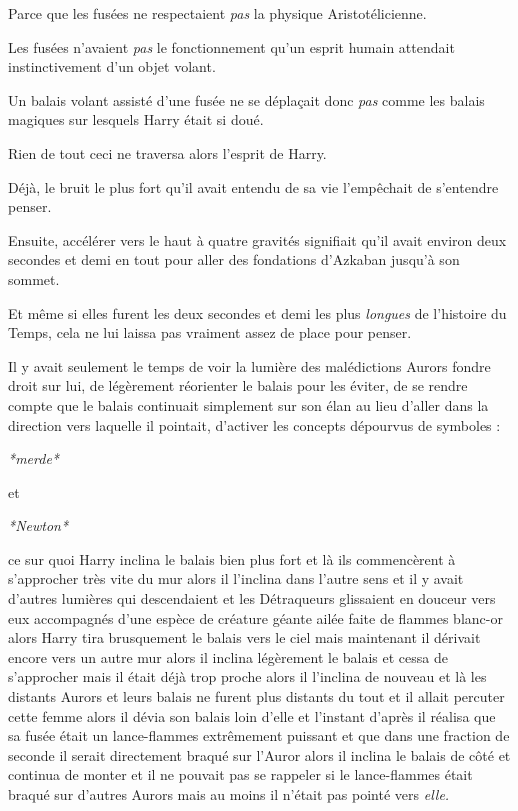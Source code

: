 Parce que les fusées ne respectaient \emph{pas}  la physique Aristotélicienne.

Les fusées n'avaient \emph{pas}  le fonctionnement qu'un esprit humain attendait instinctivement d'un objet volant.

Un balais volant assisté d'une fusée ne se déplaçait donc \emph{pas}  comme les balais magiques sur lesquels Harry était si doué.

Rien de tout ceci ne traversa alors l'esprit de Harry.

Déjà, le bruit le plus fort qu'il avait entendu de sa vie l'empêchait de s'entendre penser.

Ensuite, accélérer vers le haut à quatre gravités signifiait qu'il avait environ deux secondes et demi en tout pour aller des fondations d'Azkaban jusqu'à son sommet.

Et même si elles furent les deux secondes et demi les plus \emph{longues}  de l'histoire du Temps, cela ne lui laissa pas vraiment assez de place pour penser.

Il y avait seulement le temps de voir la lumière des malédictions Aurors fondre droit sur lui, de légèrement réorienter le balais pour les éviter, de se rendre compte que le balais continuait simplement sur son élan au lieu d'aller dans la direction vers laquelle il pointait, d'activer les concepts dépourvus de symboles :

\emph{*merde*} 

et

\emph{*Newton*} 

ce sur quoi Harry inclina le balais bien plus fort et là ils commencèrent à s'approcher très vite du mur alors il l'inclina dans l'autre sens et il y avait d'autres lumières qui descendaient et les Détraqueurs glissaient en douceur vers eux accompagnés d'une espèce de créature géante ailée faite de flammes blanc-or alors Harry tira brusquement le balais vers le ciel mais maintenant il dérivait encore vers un autre mur alors il inclina légèrement le balais et cessa de s'approcher mais il était déjà trop proche alors il l'inclina de nouveau et là les distants Aurors et leurs balais ne furent plus distants du tout et il allait percuter cette femme alors il dévia son balais loin d'elle et l'instant d'après il réalisa que sa fusée était un lance-flammes extrêmement puissant et que dans une fraction de seconde il serait directement braqué sur l'Auror alors il inclina le balais de côté et continua de monter et il ne pouvait pas se rappeler si le lance-flammes était braqué sur d'autres Aurors mais au moins il n'était pas pointé vers \emph{elle.} 

